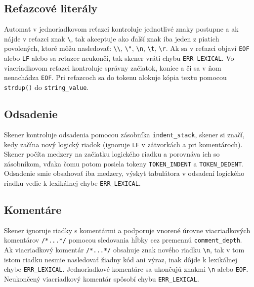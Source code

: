 \subsection{Reťazcové literály}
Automat v jednoriadkovom reťazci kontroluje jednotlivé znaky postupne a ak nájde v reťazci znak \texttt{\textbackslash{}}, tak akceptuje ako ďalší znak iba jeden z piatich povolených, ktoré môžu nasledovať: \texttt{\textbackslash{}\textbackslash{}}, \texttt{\textbackslash{}"}, \texttt{\textbackslash{}n}, \texttt{\textbackslash{}t}, \texttt{\textbackslash{}r}.
Ak sa v reťazci objaví \texttt{EOF} alebo \texttt{LF} alebo sa reťazec neukončí, tak skener vráti chybu \texttt{ERR\_LEXICAL}.
Vo viacriadkovom reťazci kontroluje správny začiatok, koniec a či sa v ňom nenachádza \texttt{EOF}.
Pri reťazcoch sa do tokenu alokuje kópia textu pomocou \texttt{strdup()} do \texttt{string\_value}.

\subsection{Odsadenie}
Skener kontroluje odsadenia pomocou zásobníka \texttt{indent\_stack}, skener si značí, kedy začína nový logický riadok (ignoruje \texttt{LF} v zátvorkách a pri komentároch).
Skener počíta medzery na začiatku logického riadku a porovnáva ich so zásobníkom, vďaka čomu potom posiela tokeny \texttt{TOKEN\_INDENT} a \texttt{TOKEN\_DEDENT}.
Odsadenie smie obsahovať iba medzery, výskyt tabulátora v odsadení logického riadku vedie k lexikálnej chybe \texttt{ERR\_LEXICAL}.

\subsection{Komentáre}
Skener ignoruje riadky s komentármi a podporuje vnorené úrovne viacriadkových komentárov \texttt{/*...*/} pomocou sledovania hĺbky cez premennú \texttt{comment\_depth}.
Ak viacriadkový komentár \texttt{/*...*/} obsahuje znak nového riadku \texttt{\textbackslash n}, tak v tom istom riadku nesmie nasledovať žiadny kód ani výraz, inak dôjde k lexikálnej chybe \texttt{ERR\_LEXICAL}.
Jednoriadkové komentáre sa ukončujú znakmi \texttt{\textbackslash{}n} alebo \texttt{EOF}.
Neukončený viacriadkový komentár spôsobí chybu \texttt{ERR\_LEXICAL}.

